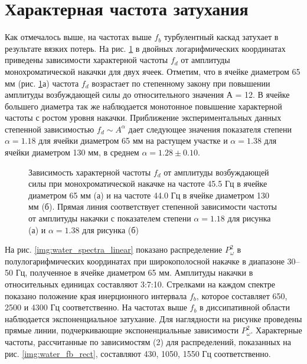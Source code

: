 \section{Характерная частота затухания}%
Как отмечалось выше, на частотах выше $f_b$ турбулентный каскад затухает в результате вязких потерь. На рис. \ref{img:water_fd_mono} в двойных логарифмических координатах приведены зависимости характерной частоты $f_d$ от амплитуды монохроматической накачки для двух ячеек. Отметим, что в ячейке диаметром 65 мм (рис. \ref{img:water_fd_mono}а) частота $f_d$ возрастает по степенному закону при повышении амплитуды возбуждающей силы до относительного значения А = 12. В ячейке большего диаметра так же наблюдается монотонное повышение характерной частоты с ростом уровня накачки. Приближение экспериментальных данных степенной зависимостью $f_d \sim A^\alpha$ дает следующее значения показателя степени $\alpha = 1.18$ для ячейки диаметром 65 мм на растущем участке и $\alpha = 1.38$ для ячейки диаметром 130 мм, в среднем $\alpha = 1.28 \pm 0.10$.

\begin{figure}[ht]
 \begin{minipage}[ht]{0.49\linewidth}
 \end{minipage}
 \hfill
 \begin{minipage}[ht]{0.49\linewidth}
 \end{minipage}
 \caption{Зависимость характерной частоты $f_d$ от амплитуды возбуждающей силы при монохроматической накачке на частоте 45.5 Гц в ячейке диаметром 65 мм (а) и на частоте 44.0 Гц в ячейке диаметром 130 мм (б).  Прямая линия соответствует степенной зависимости частоты от амплитуды накачки с показателем степени $\alpha = 1.18$ для рисунка (а) и $\alpha = 1.38$ для рисунка (б)}
 \label{img:water_fd_mono} 
\end{figure}

На рис. \ref{img:water_spectra_linear} показано распределение $P^2_\omega$ в полулогарифмических координатах при широкополосной накачке в диапазоне 30–50 Гц, полученное в ячейке диаметром 65 мм. Амплитуды накачки в относительных единицах составляют 3:7:10. Стрелками на каждом спектре показано положение края инерционного интервала $f_b$, которое составляет 650, 2500 и 4300 Гц соответственно. На частотах выше $f_b$ в диссипативной области наблюдается экспоненциальное затухание. Для наглядности на рисунке проведены прямые линии, подчеркивающие экспоненциальные зависимости $P^2_\omega$. Характерные частоты, рассчитанные по зависимостям (2) для распределений, показанных на рис. \ref{img:water_fb_rect}, составляют 430, 1050, 1550 Гц соответственно.

